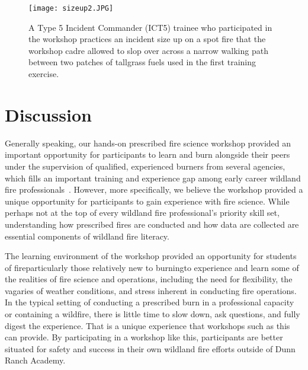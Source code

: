 \documentclass[fire,casereport,accept,moreauthors,pdftex]{Definitions/mdpi}  %
\begin{document}
\begin{figure}[H]
\texttt{[image: sizeup2.JPG]}
\caption{A Type 5 Incident Commander (ICT5) trainee who participated in the workshop practices an incident size up on a spot fire that the workshop cadre allowed to slop over across a narrow walking path between two patches of tallgrass fuels used in the first training exercise. \label{sizeup}}
\end{figure}

\section{Discussion}

Generally speaking, our hands-on prescribed fire science workshop provided an important opportunity for participants to learn and burn alongside their peers under the supervision of qualified, experienced burners from several agencies, which fills an important training and experience gap among early career wildland fire professionals~\citep{kobziar2009}.
However, more specifically, we believe the workshop provided a unique opportunity for participants to gain experience with fire science.
While perhaps not at the top of every wildland fire professional's priority skill set, understanding how prescribed fires are conducted and how data are collected are essential components of wildland fire literacy.

The learning environment of the workshop provided an opportunity for students of fire\textemdash particularly those relatively new to burning\textemdash to experience and learn some of the realities of fire science and operations, including the need for flexibility, the vagaries of weather conditions, and stress inherent in conducting fire operations.
In the typical setting of conducting a prescribed burn in a professional capacity or containing a wildfire, there is little time to slow down, ask questions, and fully digest the experience.
That is a unique experience that workshops such as this can provide.
By participating in a workshop like this, participants are better situated for safety and success in their own wildland fire efforts outside of Dunn Ranch Academy.
\end{document}
